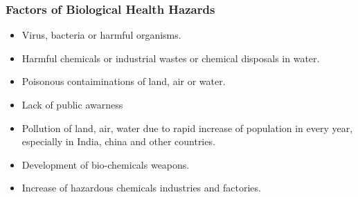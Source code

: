 \documentclass[12pt,a4paper]{article}
\begin{document}
\subsubsection*{Factors of Biological Health Hazards}
\begin{itemize}
	\item Virus, bacteria or harmful organisms.
	\item Harmful chemicals or industrial wastes or chemical disposals in water.
	\item Poisonous contaiminations of land, air or water.
	\item Lack of public awarness
	\item Pollution of land, air, water due to rapid increase of population in every year, especially in India, china and other countries.
	\item Development of bio-chemicals weapons.
	\item Increase of hazardous chemicals industries and factories.
\end{itemize}






  
\end{document}
